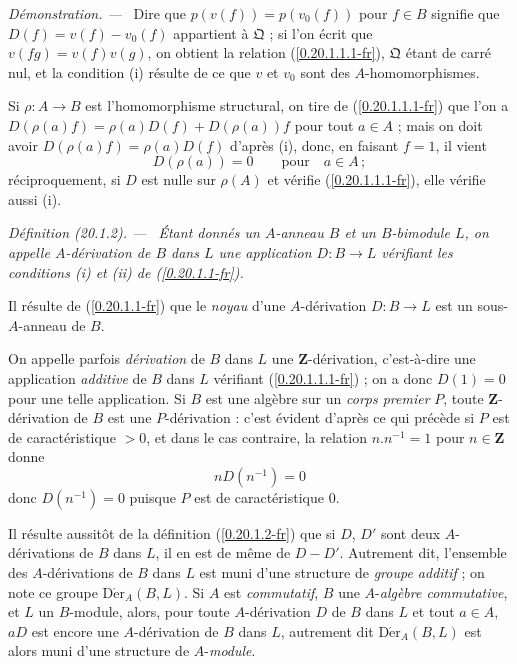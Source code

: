 \documentclass[10pt,oneside]{book}
\makeatletter
\newcommand{\sref}[1]{(\ref{#1})}
\newcommand{\setmanualcurrentlabel}[1]{\def\@currentlabel{#1}}
\newenvironment{definition}[1][]{%
  \setmanualcurrentlabel{#1}\par\medskip\noindent\itshape Définition (#1). ---\ }{\par}
\newenvironment{proof}{%
  \par\medskip\noindent\textit{Démonstration. ---\ }}{\par}
\makeatother
\begin{document}
\begin{proof}
Dire que $p(v(f))=p(v_0(f))$ pour $f\in B$ signifie que
$D(f)=v(f)-v_0(f)$ appartient à $\mathfrak{Q}$ ; si l'on écrit que
$v(fg)=v(f)v(g)$, on obtient la relation \sref{0.20.1.1.1-fr},
$\mathfrak{Q}$ étant de carré nul, et la condition (i) résulte de ce que $v$
et $v_0$ sont des $A$-homomorphismes.

Si $\rho:A\to B$ est l'homomorphisme structural, on tire de
\sref{0.20.1.1.1-fr} que l'on a
$D(\rho(a)f)=\rho(a)D(f)+D(\rho(a))f$ pour tout $a\in A$ ; mais on doit
avoir $D(\rho(a)f)=\rho(a)D(f)$ d'après (i), donc, en faisant $f=1$, il
vient
\[
  D(\rho(a))=0 \qquad\text{pour}\quad a\in A\,;
\]
réciproquement, si $D$ est nulle sur $\rho(A)$ et vérifie
\sref{0.20.1.1.1-fr}, elle vérifie aussi (i).
\end{proof}

\begin{definition}[20.1.2]
\label{0.20.1.2-fr}
Étant donnés un $A$-anneau $B$ et un $B$-bimodule $L$, on appelle
\emph{$A$-dérivation de $B$ dans $L$} une application $D:B\to L$ vérifiant
les conditions (i) et (ii) de \sref{0.20.1.1-fr}.
\end{definition}

Il résulte de \sref{0.20.1.1-fr} que le \emph{noyau} d'une $A$-dérivation
$D:B\to L$ est un sous-$A$-anneau de $B$.

On appelle parfois \emph{dérivation} de $B$ dans $L$ une
$\mathbf{Z}$-dérivation, c'est-à-dire une application \emph{additive} de $B$
dans $L$ vérifiant \sref{0.20.1.1.1-fr} ; on a donc $D(1)=0$ pour une telle
application. Si $B$ est une algèbre sur un \emph{corps premier} $P$, toute
$\mathbf{Z}$-dérivation de $B$ est une $P$-dérivation : c'est évident d'après
ce qui précède si $P$ est de caractéristique $>0$, et dans le cas contraire,
la relation $n.n^{-1}=1$ pour $n\in\mathbf{Z}$ donne
\[
  nD(n^{-1})=0
\]
donc $D(n^{-1})=0$ puisque $P$ est de caractéristique $0$.

Il résulte aussitôt de la définition \sref{0.20.1.2-fr} que si $D$, $D'$ sont
deux $A$-dérivations de $B$ dans $L$, il en est de même de $D-D'$. Autrement
dit, l'ensemble des $A$-dérivations de $B$ dans $L$ est muni d'une structure
de \emph{groupe additif} ; on note ce groupe
$\operatorname{D\acute{e}r}_A(B,L)$. Si $A$ est \emph{commutatif}, $B$ une
$A$-\emph{algèbre commutative}, et $L$ un $B$-module, alors, pour toute
$A$-dérivation $D$ de $B$ dans $L$ et tout $a\in A$, $aD$ est encore une
$A$-dérivation de $B$ dans $L$, autrement dit $\operatorname{D\acute{e}r}_A(B,L)$
est alors muni d'une structure de $A$-\emph{module}.
\end{document}
